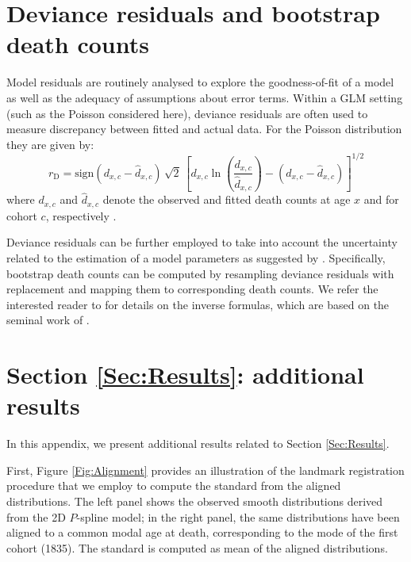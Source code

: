 \documentclass[11pt, a4paper]{article}
\begin{document}
\bigskip


 

\newpage
\appendix
{}

\section{Deviance residuals and bootstrap death counts}
\label{Appendix:ResidualDeath}     
Model residuals are routinely analysed to explore the goodness-of-fit of a model as well as the adequacy of assumptions about error terms. Within a GLM setting (such as the Poisson considered here), deviance residuals are often used to measure discrepancy between fitted and actual data. For the Poisson distribution they are given by: 
\begin{equation}\label{Eq:DevRes}
r_{\mathrm{D}}= \mathrm{sign} (d_{x,c}-\hat{d}_{x,c}) \, \sqrt{2} \, 
\left[d_{x,c} \ln \left(\frac{d_{x,c}}{\hat{d}_{x,c}}\right) - 
\left(d_{x,c}-\hat{d}_{x,c}\right)
\right]^{1/2}
\end{equation}
where $d_{x,c}$ and $\hat{d}_{x,c}$ denote the observed and fitted death counts at age $x$ and for cohort $c$, respectively \citep{mccullagh1989glm}. 

Deviance residuals can be further employed to take into account the uncertainty related to the estimation of a model parameters as suggested by \cite{koissi2006evaluating}. Specifically, bootstrap death counts can be computed by resampling deviance residuals with replacement and mapping them to corresponding death counts. We refer the interested reader to \cite{renshaw2008simulation} for details on the inverse formulas, which are based on the seminal work of \cite{efron1994introduction}.  

\section{Section \ref{Sec:Results}: additional results}
\label{Appendix:AdditResults}     

In this appendix, we present additional results related to Section \ref{Sec:Results}. 

{\color{red}
First, Figure \ref{Fig:Alignment} provides an illustration of the landmark registration procedure that we employ to compute the standard from the aligned distributions. The left panel shows the observed smooth distributions derived from the 2D $P$-spline model; in the right panel, the same distributions have been aligned to a common modal age at death, corresponding to the mode of the first cohort (1835). The standard is computed as mean of the aligned distributions. \par
}
\end{document}
